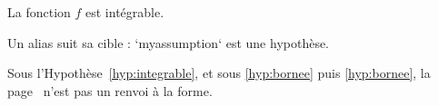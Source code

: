 \begin{assumption}[label=hyp:integrable]
  La fonction $f$ est intégrable.
\end{assumption}

\begin{myassumption}[label=hyp:bornee]
  Un alias suit sa cible : `myassumption` est une hypothèse.
\end{myassumption}

Sous l'Hypothèse~\ref{hyp:integrable}, %
et sous \eqref{hyp:bornee} puis \ref{hyp:bornee}, %
la page~\pageref{hyp:integrable} n'est pas un renvoi à la forme.
